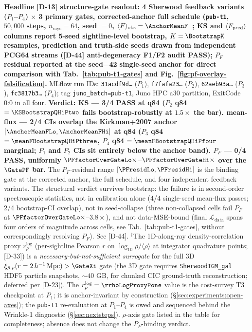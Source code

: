 \begin{table}[t]
    \caption{\textbf{Headline [D-13] structure-gate readout: 4 Sherwood feedback variants ($P_1$--$P_4$) $\times$ 3 primary gates, corrected-anchor full schedule (\texttt{pub-t1}, $50{,}000$ steps, $n_{\text{rays}}=64$, seed $=0$, $\langle F\rangle_{\text{obs}}=\AnchorMeanF$~\cite{kirkman2007}; KS and $\langle F_{\rm pred}\rangle$ columns report 5-seed sightline-level bootstrap, $K=\BootstrapK$ resamples, prediction and truth-side seeds drawn from independent PCG64 streams ([D-44] anti-degeneracy F1/F2 audit PASS); $P_F$ residual reported at the seed=42 single-seed anchor for direct comparison with Tab.~\ref{tab:pub-t1-gates} and Fig.~\ref{fig:pf-overlay-falsification}.} MLflow run IDs: \texttt{31acdf9d\dots} ($P_1$), \texttt{f7fafa23\dots} ($P_2$), \texttt{62aeb93a\dots} ($P_3$), \texttt{fc3817b3\dots} ($P_4$); tag \texttt{juno\_batch=pub-t1}, Juno HPC a30 partition, ExitCode 0:0 in all four. \textbf{Verdict: KS --- 3/4 PASS at q84 ($P_2$ q84 $=\KSBootstrapQHiPtwo$ fails bootstrap-robustly at $1.5\times$ the bar). mean-flux --- 2/4 CIs overlap the Kirkman+2007 anchor $[\AnchorMeanFLo, \AnchorMeanFHi]$ at q84 ($P_3$ q84 $=\meanFBootstrapQHiPthree$, $P_4$ q84 $=\meanFBootstrapQHiPfour$ marginal; $P_1$ and $P_2$ CIs sit entirely below the anchor band). $P_F$ --- 0/4 PASS, uniformly $\PFfactorOverGateLo\times$--$\PFfactorOverGateHi\times$ over the $\GatePF$ bar.} The $P_F$-residual range $[\PFresidLo, \PFresidHi]$ is the binding gate at the corrected anchor, the full schedule, and four independent feedback variants. The structural verdict survives bootstrap: the failure is in second-order spectroscopic statistics, not in calibration alone (4/4 single-seed mean-flux passes; 2/4 bootstrap-CI overlap), not in seed-collapse (three non-collapsed cells fail $P_F$ at $\PFfactorOverGateLo\times$--$3.8\times$), and not data-MSE-bound (final $\mathcal{L}_{\text{data}}$ spans four orders of magnitude across cells, see Tab.~\ref{tab:pub-t1-gates}, without correspondingly resolving $P_F$). See [D-44]. $^\dagger$The 1D-along-ray density-correlation proxy $r_\rho^{\log}$ (per-sightline Pearson $r$ on $\log_{10}\rho/\langle\rho\rangle$ at integrator quadrature points; [D-33]) is a \emph{necessary-but-not-sufficient surrogate} for the full 3D $\xi_{\hat\rho,\rho}(r=2\,h^{-1}\,\text{Mpc})>\GateXi$ gate (the 3D gate requires \texttt{SherwoodIGM\_gal} HDF5 particle snapshots, $\sim 40$ GB, for chunked CIC ground-truth reconstruction; deferred per [D-23]). The $r_\rho^{\log}=\rrhoLogProxyPone$ value is the cost-survey T3 checkpoint at $P_1$; it is anchor-invariant by construction (\S\ref{sec:experiments:open-axes}); the \texttt{pub-t1} re-evaluation at $P_1$--$P_4$ is owed and sequenced behind the Wrinkle-1 diagnostic (\S\ref{sec:nextsteps}). $\rho$-axis gate listed in the table for completeness; absence does not change the $P_F$-binding verdict.}
    \label{tab:headline-3gate}
\end{table}


